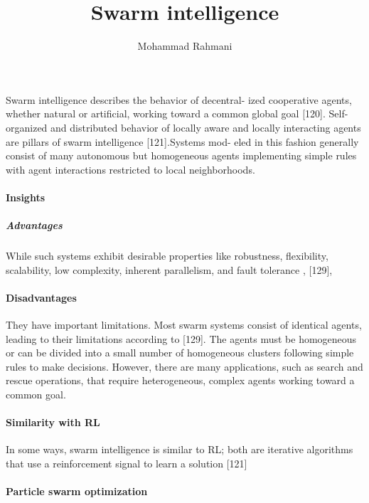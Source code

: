 \documentclass{article}
\begin{document}
	
	\title{Swarm intelligence}
	\author{Mohammad Rahmani}
	\date{}
	\maketitle
	Swarm intelligence describes the behavior of decentral-
	ized cooperative agents, whether natural or artificial, working
	toward a common global goal \cite{rizk-2018-decision-making-in-multiagent-systems-a-survey}[120]. Self-organized and distributed behavior of locally aware and locally interacting
	agents are pillars of swarm intelligence \cite{rizk-2018-decision-making-in-multiagent-systems-a-survey}[121].Systems mod-
	eled in this fashion generally consist of many autonomous but
	homogeneous agents implementing simple rules with agent
	interactions restricted to local neighborhoods.
	
	\paragraph{Insights}
		\subparagraph{Advantages}
	While such systems exhibit desirable properties like robustness, flexibility, scalability, low complexity, inherent parallelism, and fault tolerance \cite{brambilla-2013-swarm-robotics-a-review-from-the-swarm-engineering-perspective}, \cite{rizk-2018-decision-making-in-multiagent-systems-a-survey}[129], 
		\paragraph{Disadvantages} They have important
	limitations. Most swarm systems consist of identical agents,
	leading to their limitations according to \cite{rizk-2018-decision-making-in-multiagent-systems-a-survey}[129]. The agents must
	be homogeneous or can be divided into a small number of homogeneous clusters following simple rules to make decisions. However, there are many applications, such as search and rescue operations, that require heterogeneous, complex
	agents working toward a common goal.
	
	
	\paragraph{Similarity with RL}  In some ways, swarm intelligence is similar to RL; both
	are iterative algorithms that use a reinforcement signal to learn
	a solution \cite{rizk-2018-decision-making-in-multiagent-systems-a-survey}[121]
	
	
	\paragraph{Particle swarm optimization}
\end{document}
